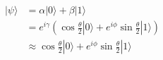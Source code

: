 \documentclass[preview]{standalone}
\begin{document}
\begin{align*}
|\psi\rangle &= \alpha |0\rangle + \beta |1\rangle \\ &=e^{i\gamma} \left(\cos{\frac{\theta}{2}} |0\rangle + e^{i\phi}\sin{\frac{\theta}{2}}|1\rangle\right) \\ & \approx \cos{\frac{\theta}{2} |0\rangle + e^{i\phi}\sin{\frac{\theta}{2}} |1\rangle}
\end{align*}
\end{document}

